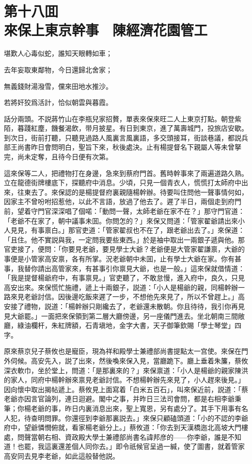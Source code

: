 
\chapter*{第十八囬　\\來保上東京幹事　陳經濟花園管工}


\begin{myquote}
堪歎人心毒似蛇，誰知天眼轉如車；

去年妄取東鄰物，今日還歸北舍家；

無義錢財湯潑雪，儻來田地水推沙。

若將奸狡爲活計，恰似朝雲與暮霞。
\end{myquote}

話分兩頭。不説蔣竹山在李瓶兒家招贅，單表來保來旺二人上東京打點。朝登紫陌，暮踐紅塵，饑餐渴飲，带月披星。有日到東京，進了萬壽城門，投旅店安歇。到次日，街前打聽，只聽見過路人風裏言風裏語，多交頭接耳，街談巷議，都説兵部王尚書昨日會問明白，聖旨下來，秋後處決。止有楊提督名下親屬人等未曾拏完，尚未定奪，且待今日便有次第。

這來保等二人，把禮物打在身邊，急來到蔡府門首。舊時幹事來了兩遍道路久熟。立在龍德街牌樓底下，探聽府中消息。少頃，只見一個青衣人，慌慌打太師府中出來，往東去了。來保認的是楊提督府裏親隨楊幹辦。待要叫住問他一聲事情何如，因家主不曾吩咐招惹他，以此不言語，放過了他去了。遲了半日，兩個走到府門前，望着守門官深深唱了個喏：「動問一聲，太師老爺在家不在？」那守門官道：「老爺不在家了，朝中議事未囬。你問怎的？」來保又問道：「管家翟爺請出來小人見見，有事禀白。」那官吏道：「管家翟叔也不在了，跟老爺出去了。」來保道：「且住。他不實説與我，一定問我要些東西。」於是袖中取出一兩銀子遞與他。那官吏接了，便問：「你要見老爺，要見學士大爺？老爺便是大管家翟謙禀，大爺的事便是小管家高安禀，各有所掌。況老爺朝中未囬，止有學士大爺在家。你有甚事，我替你請出高管家來，有甚事引你禀見大爺，也是一般。」這來保就借情道：「我是提督楊爺府中，有事禀見。」官吏聽了，不敢怠慢，進入府中，良久，只見高安出來。來保慌忙施禮，遞上十兩銀子，説道：「小人是楊爺的親，同楊幹辦一路來見老爺討信。因後邊吃飯來遲了一步，不想他先來見了，所以不曾趕上。」高安接了禮物，説道：「楊幹辦只剛纔去了，老爺還未散朝。你且待待，我引你再見見大爺罷。」一面把來保領到第二層大廳傍邊，另一座儀門進去。坐北朝南三間敞廳，綠油欄杆，朱紅牌額，石青塡地，金字大書，天子御筆欽賜「學士琴堂」四字。

原來蔡京兒子蔡攸也是寵臣，現為祥和殿學士兼禮部尚書提點太一宫使。來保在門外伺候。高安先入，説了出來，然後喚來保入見，當廳跪下。廳上垂着朱簾，蔡攸深衣軟巾，坐於堂上，問道：「是那裏來的？」來保禀道：「小人是楊爺的親家陳洪的家人，同府中楊幹辦來禀見老爺討信。不想楊幹辦先來見了，小人趕來後見。」因向懷中取出揭帖遞上。蔡攸見上面寫着「白米五百石」，叫來保近前，説道：「蔡老爺亦因言官論列，連日迴避。閣中之事，并昨日三法司會問，都是右相李爺秉筆；你楊老爺的事，昨日内裏消息出來，聖上寬恩，另有處分了。其手下用事有名人犯，待查明問罪。你還徑到李爺那裏説去。」來保只顧磕頭道：「小的不認的李爺府中，望爺憐憫俯就，看家楊老爺分上。」蔡攸道：「你去到天漢橋迤北高坡大門樓處，問聲當朝右相、資政殿大學士兼禮部尚書名諱邦彦的——你李爺，誰是不知道！也罷，我這裏還差個人同你去。」即令祇候官呈過一緘，使了圖書，就着管家高安同去見李老爺，如此這般替他説。

